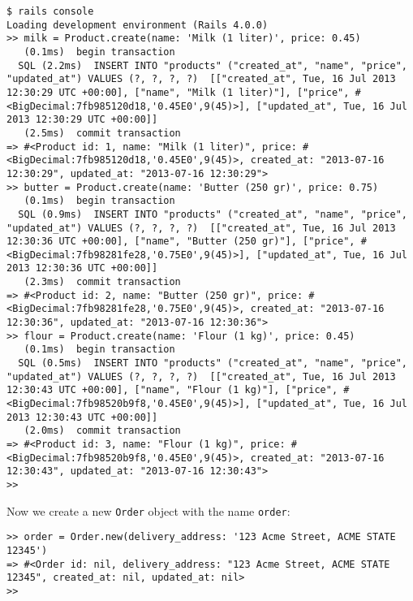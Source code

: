 \documentclass[a4paper]{book}
\begin{document}
\begin{shaded}\begin{verbatim}
$ rails console
Loading development environment (Rails 4.0.0)
>> milk = Product.create(name: 'Milk (1 liter)', price: 0.45)
   (0.1ms)  begin transaction
  SQL (2.2ms)  INSERT INTO "products" ("created_at", "name", "price", "updated_at") VALUES (?, ?, ?, ?)  [["created_at", Tue, 16 Jul 2013 12:30:29 UTC +00:00], ["name", "Milk (1 liter)"], ["price", #<BigDecimal:7fb985120d18,'0.45E0',9(45)>], ["updated_at", Tue, 16 Jul 2013 12:30:29 UTC +00:00]]
   (2.5ms)  commit transaction
=> #<Product id: 1, name: "Milk (1 liter)", price: #<BigDecimal:7fb985120d18,'0.45E0',9(45)>, created_at: "2013-07-16 12:30:29", updated_at: "2013-07-16 12:30:29">
>> butter = Product.create(name: 'Butter (250 gr)', price: 0.75)
   (0.1ms)  begin transaction
  SQL (0.9ms)  INSERT INTO "products" ("created_at", "name", "price", "updated_at") VALUES (?, ?, ?, ?)  [["created_at", Tue, 16 Jul 2013 12:30:36 UTC +00:00], ["name", "Butter (250 gr)"], ["price", #<BigDecimal:7fb98281fe28,'0.75E0',9(45)>], ["updated_at", Tue, 16 Jul 2013 12:30:36 UTC +00:00]]
   (2.3ms)  commit transaction
=> #<Product id: 2, name: "Butter (250 gr)", price: #<BigDecimal:7fb98281fe28,'0.75E0',9(45)>, created_at: "2013-07-16 12:30:36", updated_at: "2013-07-16 12:30:36">
>> flour = Product.create(name: 'Flour (1 kg)', price: 0.45)
   (0.1ms)  begin transaction
  SQL (0.5ms)  INSERT INTO "products" ("created_at", "name", "price", "updated_at") VALUES (?, ?, ?, ?)  [["created_at", Tue, 16 Jul 2013 12:30:43 UTC +00:00], ["name", "Flour (1 kg)"], ["price", #<BigDecimal:7fb98520b9f8,'0.45E0',9(45)>], ["updated_at", Tue, 16 Jul 2013 12:30:43 UTC +00:00]]
   (2.0ms)  commit transaction
=> #<Product id: 3, name: "Flour (1 kg)", price: #<BigDecimal:7fb98520b9f8,'0.45E0',9(45)>, created_at: "2013-07-16 12:30:43", updated_at: "2013-07-16 12:30:43">
>>  
\end{verbatim}\end{shaded}

Now we create a new \texttt{Order} object with the name \texttt{order}:

\begin{shaded}\begin{verbatim}
>> order = Order.new(delivery_address: '123 Acme Street, ACME STATE 12345')
=> #<Order id: nil, delivery_address: "123 Acme Street, ACME STATE 12345", created_at: nil, updated_at: nil>
>>
\end{verbatim}\end{shaded}
\end{document}

